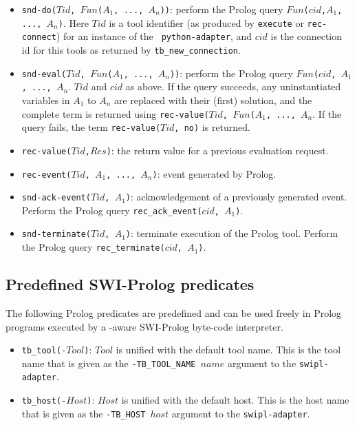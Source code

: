 {\begin{itemize}
\item {\tt snd-do($Tid$, $Fun$($A_1$, ..., $A_n$))}: perform the Prolog
query
{\tt $Fun$($cid$,$A_1$, ..., $A_n$)}. Here $Tid$ is a tool identifier
(as produced by {\tt execute} or {\tt rec-connect}) for an instance of the {\tt
python-adapter}, and $cid$ is the connection id for this tools as returned
by {\tt tb_new_connection}.
\item {\tt snd-eval($Tid$, $Fun$($A_1$, ..., $A_n$))}: perform the Prolog
query
{\tt $Fun$($cid$, $A_1$, ..., $A_n$}. $Tid$ and $cid$ as above.
If the query succeeds, any uninstantiated variables in $A_1$ to $A_n$ are
replaced with their (first) solution, and the complete term is returned
using {\tt rec-value($Tid$, $Fun$($A_1$, ..., $A_n$}.
If the query fails, the term {\tt rec-value($Tid$, no)}
is returned.
\item {\tt rec-value($Tid$,$Res$)}: the return value for a previous evaluation request.
\item {\tt rec-event($Tid$, $A_1$, ..., $A_n$)}: event generated by Prolog.
\item {\tt snd-ack-event($Tid$, $A_1$)}: acknowledgement of
a previously generated event. Perform the Prolog query
{\tt rec\_ack\_event($cid$, $A_1$)}.
\item {\tt snd-terminate($Tid$, $A_1$)}: terminate execution of the
Prolog tool. Perform the Prolog query
{\tt rec\_terminate($cid$, $A_1$)}.
\end{itemize}


\subsection{\label{Prolog-predicates}Predefined SWI-Prolog predicates}
The following Prolog predicates are predefined and can be used freely in
Prolog programs executed by a \TB -aware SWI-Prolog byte-code interpreter.

\begin{itemize}

\item {\tt tb_tool(-$Tool$)}: $Tool$ is unified with the default tool name.
      This is the tool name that is given as the {\tt -TB_TOOL_NAME $name$}
      argument to the {\tt swipl-adapter}.

\item {\tt tb_host(-$Host$)}: $Host$ is unified with the default host.
      This is the host name that is given as the {\tt -TB_HOST $host$}
      argument to the {\tt swipl-adapter}.


\end{itemize}}
